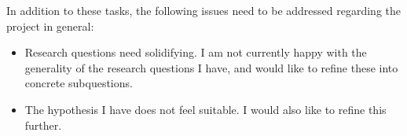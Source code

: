 \documentclass{mattreport}
\begin{document}
In addition to these tasks, the following issues need to be addressed regarding the project in general:

\begin{itemize}
    \item Research questions need solidifying. I am not currently happy with the generality of the research questions I have, and would like to refine these into concrete subquestions.
    \item The hypothesis I have does not feel suitable. I would also like to refine this further.
\end{itemize}

\newpage
\printbibliography
\end{document}
